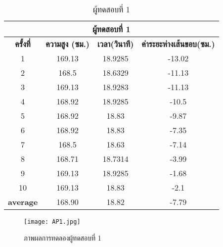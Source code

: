 \label{appendix1}
\clearpage

\begin{table}[!htb] 
\centering
\caption{ผู้ทดสอบที่ 1}
\label{tab:1}
\begin{tabular}{|c|c|c|c|}
\hline
\multicolumn{4}{|c|}{\textbf{ผู้ทดสอบที่ 1}}    \\ \hline
\textbf{ครั้งที่} & \textbf{ความสูง (ซม.)} & \textbf{เวลา(วินาที)} & \textbf{ค่าระยะห่างเส้นขอบ(ซม.)}  \\ \hline
1                 & 169.13                	& 18.9285               	& -13.02             	\\ \hline
2                 & 168.5                  	& 18.6329               	& -11.13     		   	\\ \hline
3                 & 169.13                	 & 18.9283               	& -11.13              	\\ \hline
4                 & 168.92                	 & 18.9285               	& -10.5          		 \\ \hline
5                 & 168.92                 	& 18.83                 	& -9.87      				\\ \hline
6                 & 168.92                 	& 18.83                 	& -7.35                     \\ \hline
7                 & 168.5                	 	& 18.63                 	& -7.14                      \\ \hline
8                 & 168.71                 	& 18.7314               	& -3.99                \\ \hline
9                 & 169.13                 	& 18.9285               	& -1.68                                       \\ \hline
10                & 169.13                	& 18.83                 	& -2.1                                           \\ \hline
\textbf{average}  & 168.90                 & 18.82                 & -7.79                                    \\ \hline
\end{tabular}
\end{table}

\begin{figure}[!ht]
\centering
\texttt{[image: AP1.jpg]}
\caption{ภาพผลการทดลองผู้ทดสอบที่ 1}
\label{fig:AP1.jpg}
\end{figure}


